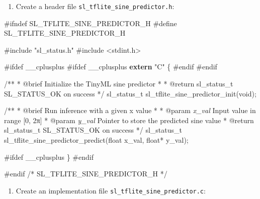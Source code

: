 \documentclass[
  9pt,
  letterpaper,
  abstract,
  titlepage]{scrbook}
\newenvironment{Shaded}{\begin{snugshade}}{\end{snugshade}}
\newcommand{\AnnotationTok}[1]{\textcolor[rgb]{0.37,0.37,0.37}{#1}}
\newcommand{\CommentTok}[1]{\textcolor[rgb]{0.37,0.37,0.37}{#1}}
\newcommand{\CommentVarTok}[1]{\textcolor[rgb]{0.37,0.37,0.37}{\textit{#1}}}
\newcommand{\DataTypeTok}[1]{\textcolor[rgb]{0.68,0.00,0.00}{#1}}
\newcommand{\ImportTok}[1]{\textcolor[rgb]{0.00,0.46,0.62}{#1}}
\newcommand{\KeywordTok}[1]{\textcolor[rgb]{0.00,0.23,0.31}{\textbf{#1}}}
\newcommand{\NormalTok}[1]{\textcolor[rgb]{0.00,0.23,0.31}{#1}}
\newcommand{\OperatorTok}[1]{\textcolor[rgb]{0.37,0.37,0.37}{#1}}
\newcommand{\PreprocessorTok}[1]{\textcolor[rgb]{0.68,0.00,0.00}{#1}}
\newcommand{\StringTok}[1]{\textcolor[rgb]{0.13,0.47,0.30}{#1}}
\providecommand{\tightlist}{%
  \setlength{\itemsep}{0pt}\setlength{\parskip}{0pt}}\usepackage{longtable,booktabs,array}
\def\tightlist{}
\let\tightlist\relax
\begin{document}
\begin{enumerate}
\def\labelenumi{\arabic{enumi}.}
\tightlist
\item
  Create a header file \texttt{sl\_tflite\_sine\_predictor.h}:
\end{enumerate}

\begin{Shaded}
\begin{Highlighting}[]
\PreprocessorTok{\#ifndef SL\_TFLITE\_SINE\_PREDICTOR\_H}
\PreprocessorTok{\#define SL\_TFLITE\_SINE\_PREDICTOR\_H}

\PreprocessorTok{\#include }\ImportTok{"sl\_status.h"}
\PreprocessorTok{\#include }\ImportTok{\textless{}stdint.h\textgreater{}}

\PreprocessorTok{\#ifdef \_\_cplusplus}
\PreprocessorTok{\#ifdef \_\_cplusplus}
\KeywordTok{extern} \StringTok{"C"} \OperatorTok{\{}
\PreprocessorTok{\#endif}
\PreprocessorTok{\#endif}

\CommentTok{/**}
\CommentTok{ * }\AnnotationTok{@brief}\CommentTok{ Initialize the TinyML sine predictor}
\CommentTok{ *}
\CommentTok{ * }\AnnotationTok{@return}\CommentTok{ sl\_status\_t SL\_STATUS\_OK on success}
\CommentTok{ */}
\NormalTok{sl\_status\_t sl\_tflite\_sine\_predictor\_init}\OperatorTok{(}\DataTypeTok{void}\OperatorTok{);}

\CommentTok{/**}
\CommentTok{ * }\AnnotationTok{@brief}\CommentTok{ Run inference with a given x value}
\CommentTok{ *}
\CommentTok{ * }\AnnotationTok{@param}\CommentTok{ }\CommentVarTok{x\_val}\CommentTok{ Input value in range [0, 2π]}
\CommentTok{ * }\AnnotationTok{@param}\CommentTok{ }\CommentVarTok{y\_val}\CommentTok{ Pointer to store the predicted sine value}
\CommentTok{ * }\AnnotationTok{@return}\CommentTok{ sl\_status\_t SL\_STATUS\_OK on success}
\CommentTok{ */}
\NormalTok{sl\_status\_t sl\_tflite\_sine\_predictor\_predict}\OperatorTok{(}\DataTypeTok{float}\NormalTok{ x\_val}\OperatorTok{,} \DataTypeTok{float}\OperatorTok{*}\NormalTok{ y\_val}\OperatorTok{);}

\PreprocessorTok{\#ifdef \_\_cplusplus}
\OperatorTok{\}}
\PreprocessorTok{\#endif}

\PreprocessorTok{\#endif }\CommentTok{/* SL\_TFLITE\_SINE\_PREDICTOR\_H */}
\end{Highlighting}
\end{Shaded}

\begin{enumerate}
\def\labelenumi{\arabic{enumi}.}
\setcounter{enumi}{1}
\tightlist
\item
  Create an implementation file \texttt{sl\_tflite\_sine\_predictor.c}:
\end{enumerate}
\end{document}
